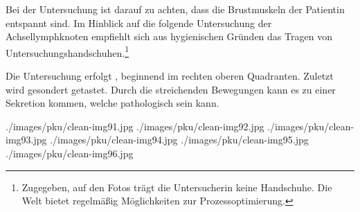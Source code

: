 {Bei der Untersuchung ist darauf zu achten, dass die
Brustmuskeln der Patientin entspannt sind. Im Hinblick
auf die folgende Untersuchung der Achsellymphknoten
empfiehlt sich aus hygienischen Gründen das Tragen von
Untersuchungshandschuhen.\footnote{Zugegeben, auf den Fotos trägt die Untersucherin keine Handschuhe. Die Welt bietet regelmäßig Möglichkeiten zur Prozessoptimierung.}

Die Untersuchung
erfolgt , beginnend im rechten oberen Quadranten. Zuletzt
wird gesondert  getastet.
Durch die streichenden Bewegungen kann es zu einer
Sekretion kommen, welche pathologisch sein kann.

}{
\begin{PkuBefunde}[]
  \item[\SymbolPkuNormal] 
\end{PkuBefunde}
}{}{}{}

\begin{PictureSeriesWide}{}{}
{./images/pku/clean-img91.jpg}
{}
{./images/pku/clean-img92.jpg}
{}
{./images/pku/clean-img93.jpg}
{}
{}
{}
{./images/pku/clean-img94.jpg}
{}
{./images/pku/clean-img95.jpg}
{}
{./images/pku/clean-img96.jpg}
{}
{}
{}
\end{PictureSeriesWide}




